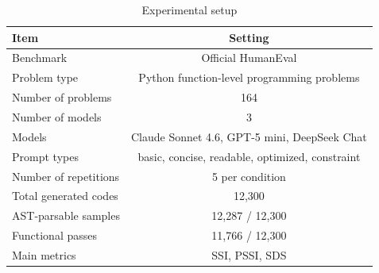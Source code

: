 \begin{table}[t]
\centering
\caption{Experimental setup}
\label{tab:experimental_setup}
\begin{tabular}{lc}
\toprule
Item & Setting \\
\midrule
Benchmark & Official HumanEval \\
Problem type & Python function-level programming problems \\
Number of problems & 164 \\
Number of models & 3 \\
Models & Claude Sonnet 4.6, GPT-5 mini, DeepSeek Chat \\
Prompt types & basic, concise, readable, optimized, constraint \\
Number of repetitions & 5 per condition \\
Total generated codes & 12,300 \\
AST-parsable samples & 12,287 / 12,300 \\
Functional passes & 11,766 / 12,300 \\
Main metrics & SSI, PSSI, SDS \\
\bottomrule
\end{tabular}
\end{table}
